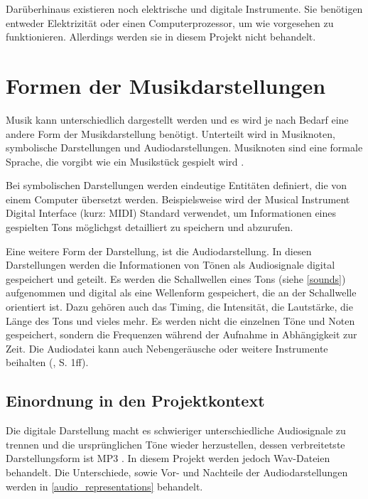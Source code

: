 \par

Darüberhinaus existieren noch elektrische und digitale Instrumente. Sie benötigen entweder Elektrizität oder einen Computerprozessor, um wie vorgesehen zu funktionieren. Allerdings werden sie in diesem Projekt nicht behandelt.

%
\section{Formen der Musikdarstellungen}
%

Musik kann unterschiedlich dargestellt werden und es wird je nach Bedarf eine andere Form der Musikdarstellung benötigt. Unterteilt wird in Musiknoten, symbolische Darstellungen und Audiodarstellungen. Musiknoten sind eine formale Sprache, die vorgibt wie ein Musikstück gespielt wird \parencite{sheet_music_representations}.

\par

Bei symbolischen Darstellungen werden eindeutige Entitäten definiert, die von einem Computer übersetzt werden. Beispielsweise wird der Musical Instrument Digital Interface (kurz: MIDI) Standard verwendet, um Informationen eines gespielten Tons möglichgst detailliert zu speichern und abzurufen.

\par

Eine weitere Form der Darstellung, ist die Audiodarstellung. In diesen Darstellungen werden die Informationen von Tönen als Audiosignale digital gespeichert und geteilt. Es werden die Schallwellen eines Tons (siehe \cref{sounds}) aufgenommen und digital als eine Wellenform gespeichert, die an der Schallwelle orientiert ist. Dazu gehören auch das Timing, die Intensität, die Lautstärke, die Länge des Tons und vieles mehr. Es werden nicht die einzelnen Töne und Noten gespeichert, sondern die Frequenzen während der Aufnahme in Abhängigkeit zur Zeit. Die Audiodatei kann auch Nebengeräusche oder weitere Instrumente beihalten (\cite{fundamentals_of_music_processing}, S. 1ff).

\subsection{Einordnung in den Projektkontext}

Die digitale Darstellung macht es schwieriger unterschiedliche Audiosignale zu trennen und die ursprünglichen Töne wieder herzustellen, dessen verbreitetste Darstellungsform ist MP3 \parencite{mp3_most_popular}. In diesem Projekt werden jedoch Wav-Dateien behandelt. Die Unterschiede, sowie Vor- und Nachteile der Audiodarstellungen werden in \cref{audio_representations} behandelt.

